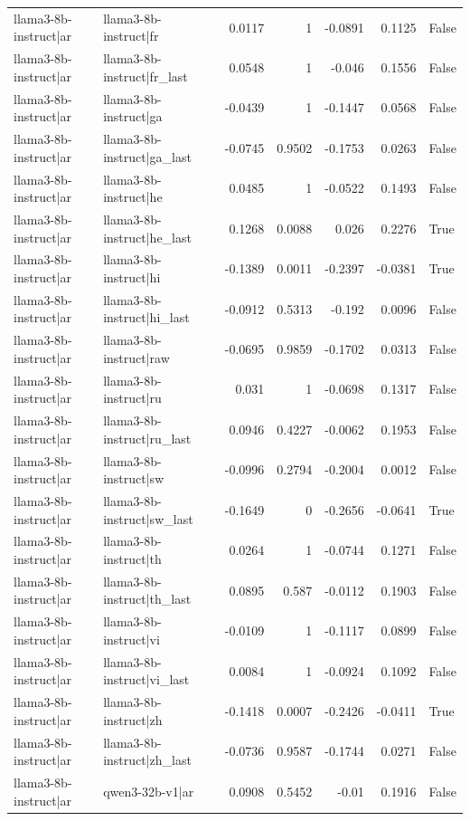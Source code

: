 \begin{table}
\begin{tabular}{l l r r r r l}
llama3-8b-instruct|ar & llama3-8b-instruct|fr & 0.0117 & 1 & -0.0891 & 0.1125 & False \\
llama3-8b-instruct|ar & llama3-8b-instruct|fr_last & 0.0548 & 1 & -0.046 & 0.1556 & False \\
llama3-8b-instruct|ar & llama3-8b-instruct|ga & -0.0439 & 1 & -0.1447 & 0.0568 & False \\
llama3-8b-instruct|ar & llama3-8b-instruct|ga_last & -0.0745 & 0.9502 & -0.1753 & 0.0263 & False \\
llama3-8b-instruct|ar & llama3-8b-instruct|he & 0.0485 & 1 & -0.0522 & 0.1493 & False \\
llama3-8b-instruct|ar & llama3-8b-instruct|he_last & 0.1268 & 0.0088 & 0.026 & 0.2276 & True \\
llama3-8b-instruct|ar & llama3-8b-instruct|hi & -0.1389 & 0.0011 & -0.2397 & -0.0381 & True \\
llama3-8b-instruct|ar & llama3-8b-instruct|hi_last & -0.0912 & 0.5313 & -0.192 & 0.0096 & False \\
llama3-8b-instruct|ar & llama3-8b-instruct|raw & -0.0695 & 0.9859 & -0.1702 & 0.0313 & False \\
llama3-8b-instruct|ar & llama3-8b-instruct|ru & 0.031 & 1 & -0.0698 & 0.1317 & False \\
llama3-8b-instruct|ar & llama3-8b-instruct|ru_last & 0.0946 & 0.4227 & -0.0062 & 0.1953 & False \\
llama3-8b-instruct|ar & llama3-8b-instruct|sw & -0.0996 & 0.2794 & -0.2004 & 0.0012 & False \\
llama3-8b-instruct|ar & llama3-8b-instruct|sw_last & -0.1649 & 0 & -0.2656 & -0.0641 & True \\
llama3-8b-instruct|ar & llama3-8b-instruct|th & 0.0264 & 1 & -0.0744 & 0.1271 & False \\
llama3-8b-instruct|ar & llama3-8b-instruct|th_last & 0.0895 & 0.587 & -0.0112 & 0.1903 & False \\
llama3-8b-instruct|ar & llama3-8b-instruct|vi & -0.0109 & 1 & -0.1117 & 0.0899 & False \\
llama3-8b-instruct|ar & llama3-8b-instruct|vi_last & 0.0084 & 1 & -0.0924 & 0.1092 & False \\
llama3-8b-instruct|ar & llama3-8b-instruct|zh & -0.1418 & 0.0007 & -0.2426 & -0.0411 & True \\
llama3-8b-instruct|ar & llama3-8b-instruct|zh_last & -0.0736 & 0.9587 & -0.1744 & 0.0271 & False \\
llama3-8b-instruct|ar & qwen3-32b-v1|ar & 0.0908 & 0.5452 & -0.01 & 0.1916 & False \\

\end{tabular}
\end{table}
